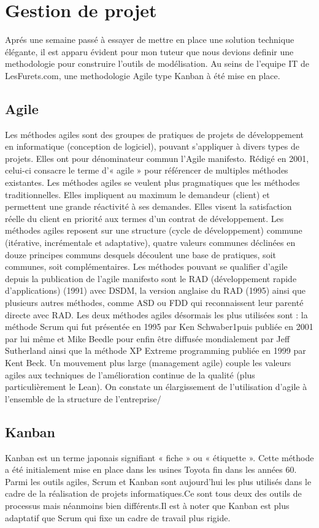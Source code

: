 \chapter{Gestion de projet}

Aprés une semaine passé à essayer de mettre en place une solution technique élégante, il est apparu évident pour mon tuteur que nous devions definir une methodologie pour construire l'outils de modélisation. Au seins de l'equipe IT de LesFurets.com, une methodologie Agile type Kanban à été mise en place.

\section{Agile}
Les méthodes agiles sont des groupes de pratiques de projets de développement en informatique (conception de logiciel), pouvant s'appliquer à divers types de projets. Elles ont pour dénominateur commun l'Agile manifesto. Rédigé en 2001, celui-ci consacre le terme d'« agile » pour référencer de multiples méthodes existantes. Les méthodes agiles se veulent plus pragmatiques que les méthodes traditionnelles. Elles impliquent au maximum le demandeur (client) et permettent une grande réactivité à ses demandes. Elles visent la satisfaction réelle du client en priorité aux termes d'un contrat de développement.
Les méthodes agiles reposent sur une structure (cycle de développement) commune (itérative, incrémentale et adaptative), quatre valeurs communes déclinées en douze principes communs desquels découlent une base de pratiques, soit communes, soit complémentaires.
Les méthodes pouvant se qualifier d'agile depuis la publication de l'agile manifesto sont le RAD (développement rapide d'applications) (1991) avec DSDM, la version anglaise du RAD (1995) ainsi que plusieurs autres méthodes, comme ASD ou FDD qui reconnaissent leur parenté directe avec RAD. Les deux méthodes agiles désormais les plus utilisées sont : la méthode Scrum qui fut présentée en 1995 par Ken Schwaber1puis publiée en 2001 par lui même et Mike Beedle pour enfin être diffusée mondialement par Jeff Sutherland ainsi que la méthode XP Extreme programming publiée en 1999 par Kent Beck.
Un mouvement plus large (management agile) couple les valeurs agiles aux techniques de l'amélioration continue de la qualité (plus particulièrement le Lean). On constate un élargissement de l'utilisation d'agile à l'ensemble de la structure de l'entreprise/

\section{Kanban}
Kanban est un terme japonais signifiant « fiche » ou « étiquette ».
Cette méthode a été initialement mise en place dans les usines Toyota fin dans les années 60.
Parmi les outils agiles, Scrum et Kanban sont aujourd'hui les plus utilisés dans le cadre de la réalisation de projets informatiques.Ce sont tous deux des outils de processus mais néanmoins bien différents.Il est à noter que Kanban est plus adaptatif que Scrum qui fixe un cadre de travail plus rigide.

